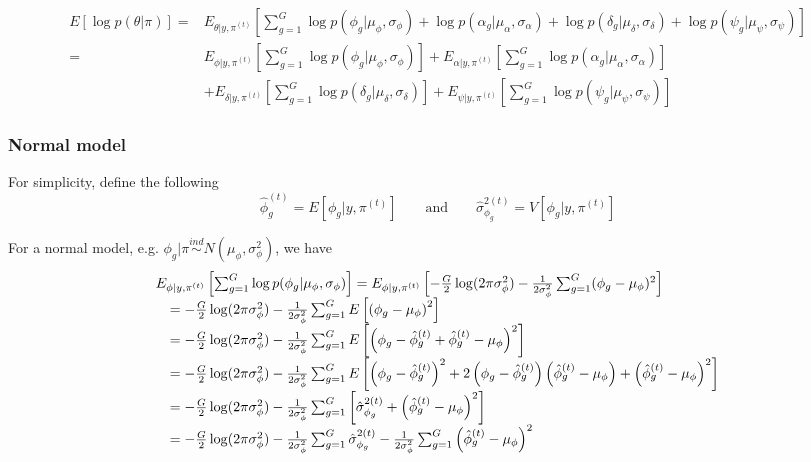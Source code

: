 \documentclass{article}
\begin{document}
\begin{align*}
E[\log p(\theta|\pi)]
=& E_{\theta|y,\pi^{(t)}} \left[ \sum_{g=1}^G \log p(\phi_g|\mu_\phi, \sigma_\phi) +\log p(\alpha_g|\mu_\alpha, \sigma_\alpha) +\log p(\delta_g|\mu_\delta, \sigma_\delta) +\log p(\psi_g|\mu_\psi, \sigma_\psi) \right] \\
=& E_{\phi|y,\pi^{(t)}} \left[ \sum_{g=1}^G \log p(\phi_g|\mu_\phi, \sigma_\phi) \right] +  E_{\alpha|y,\pi^{(t)}} \left[ \sum_{g=1}^G \log p(\alpha_g|\mu_\alpha, \sigma_\alpha) \right] \\
&+  E_{\delta|y,\pi^{(t)}} \left[ \sum_{g=1}^G \log p(\delta_g|\mu_\delta, \sigma_\delta) \right] +  E_{\psi|y,\pi^{(t)}} \left[ \sum_{g=1}^G \log p(\psi_g|\mu_\psi, \sigma_\psi) \right]
\end{align*}

\subsubsection{Normal model}

For simplicity, define the following 
\[
\hat{\phi}_{g}^{(t)} = E[\phi_g|y,\pi^{(t)}] \qquad \mbox{and} \qquad
\hat{\sigma}_{\phi_g}^{2(t)} = V[\phi_g|y,\pi^{(t)}] 
\]

For a normal model, e.g. $\phi_g|\pi \stackrel{ind}{\sim} N(\mu_\phi,\sigma_\phi^2)$, we have 
\[ 
\begin{array}{rl}
\multicolumn{2}{l}{
E_{\phi|y,\pi^{(t)}} \left[ \sum_{g=1}^G \log p(\phi_g|\mu_\phi, \sigma_\phi) \right] = 
E_{\phi|y,\pi^{(t)}} \left[ -\frac{G}{2}\log(2\pi \sigma_\phi^2) - \frac{1}{2\sigma_\phi^2} \sum_{g=1}^G (\phi_g-\mu_\phi)^2 \right]} \\
&= -\frac{G}{2}\log(2\pi \sigma_\phi^2) - \frac{1}{2\sigma_\phi^2} \sum_{g=1}^G E\left[\left(\phi_g-\mu_\phi\right)^2\right]\\
&= -\frac{G}{2}\log(2\pi \sigma_\phi^2) - \frac{1}{2\sigma_\phi^2} \sum_{g=1}^G E\left[\left(\phi_g-\hat{\phi}_{g}^{(t)}+\hat{\phi}_{g}^{(t)}-\mu_\phi\right)^2\right]\\
&= -\frac{G}{2}\log(2\pi \sigma_\phi^2) - \frac{1}{2\sigma_\phi^2} \sum_{g=1}^G 
E\left[\left(\phi_g-\hat{\phi}_{g}^{(t)}\right)^2+2\left(\phi_g-\hat{\phi}_{g}^{(t)}\right)\left(\hat{\phi}_{g}^{(t)}-\mu_\phi\right)+\left(\hat{\phi}_{g}^{(t)}-\mu_\phi\right)^2\right]\\
&= -\frac{G}{2}\log(2\pi \sigma_\phi^2) - \frac{1}{2\sigma_\phi^2} \sum_{g=1}^G \left[ \hat{\sigma}_{\phi_g}^{2(t)} + \left(\hat{\phi}_{g}^{(t)}-\mu_\phi\right)^2 \right]\\
&= -\frac{G}{2}\log(2\pi \sigma_\phi^2) - \frac{1}{2\sigma_\phi^2} \sum_{g=1}^G \hat{\sigma}_{\phi_g}^{2(t)} - \frac{1}{2\sigma_\phi^2} \sum_{g=1}^G \left(\hat{\phi}_{g}^{(t)}-\mu_\phi\right)^2 
\end{array}
\]
\end{document}
